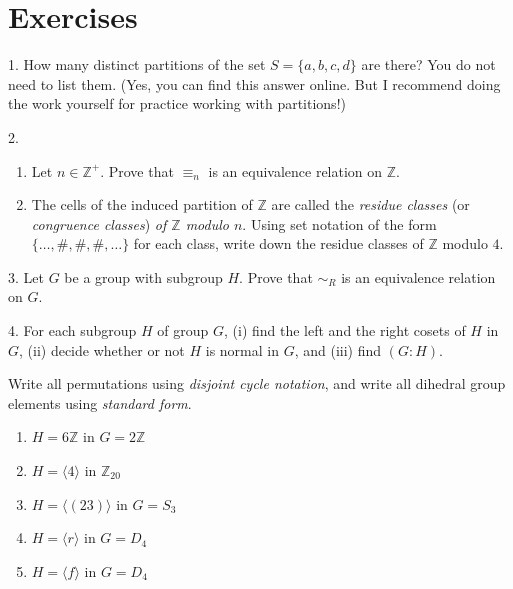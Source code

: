 \documentclass[10pt,]{book}
\theoremstyle{plain}
\theoremstyle{definition}
\theoremstyle{definition}
\theoremstyle{definition}
\theoremstyle{definition}
\numberwithin{equation}{section}
\def\Z{\mathbb{Z}}
\def\simr{\sim_R}
\begin{document}
\section[{Exercises}]{Exercises}\label{exercises-8}
\begin{exerciselist}
\item[1.]\hypertarget{exercise-50}{}How many distinct partitions of the set \(S=\{a,b,c,d\}\) are there? You do not need to list them. (Yes, you can find this answer online. But I recommend doing the work yourself for practice working with partitions!)%
\par\smallskip
\item[2.]\hypertarget{exercise-51}{}\leavevmode%
\begin{enumerate}[label=(\alph*)]
\item\hypertarget{li-408}{}Let  \(n\in \Z^+\). Prove that  \(\equiv_n\) is an equivalence relation on \(\Z\).%
\item\hypertarget{li-409}{}The cells of the induced partition of \(\Z\) are called the \emph{residue classes} (or \emph{congruence classes}) \emph{of \(\Z\) modulo \(n\)}.  Using set notation of the form \(\{\ldots,\#, \#,\#,\ldots\}\) for each class, write down the residue classes of \(\Z\) modulo \(4\).%
\end{enumerate}
\par\smallskip
\item[3.]\hypertarget{exercise-52}{}Let \(G\) be a group with subgroup \(H\). Prove that \(\simr\) is an equivalence relation on \(G\).%
\par\smallskip
\item[4.]\hypertarget{exercise-53}{}For each subgroup \(H\) of group \(G\), (i) find the left and the right cosets of \(H\) in \(G\), (ii) decide whether or not \(H\) is normal in \(G\), and (iii) find \((G:H)\).%
\par
Write all permutations using \emph{disjoint cycle notation}, and write all dihedral group elements using \emph{standard form}.%
\leavevmode%
\begin{enumerate}[label=(\alph*)]
\item\hypertarget{li-412}{}\(H=6\Z\) in \(G=2\Z\)%
\item\hypertarget{li-413}{}\(H=\langle 4\rangle\) in \(\Z_{20}\)%
\item\hypertarget{li-414}{}\(H=\langle (23)\rangle\) in \(G=S_3\)%
\item\hypertarget{li-415}{}\(H=\langle r\rangle\) in \(G=D_4\)%
\item\hypertarget{li-416}{}\(H=\langle f\rangle\) in \(G=D_4\)%

\end{enumerate}
\end{exerciselist}
\end{document}
